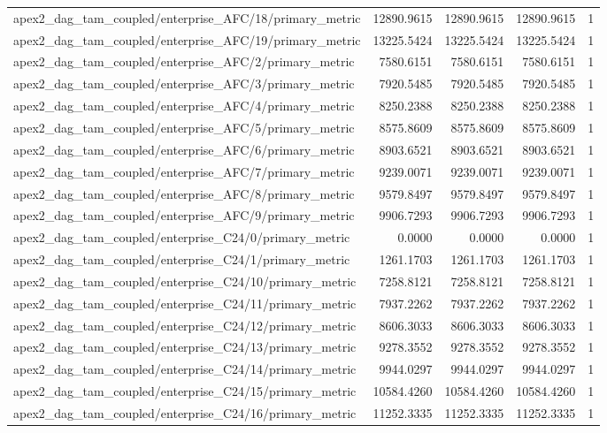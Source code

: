 \begin{table}[h]
\begin{tabular}{lrrrr}
apex2_dag_tam_coupled/enterprise_AFC/18/primary_metric & 12890.9615 & 12890.9615 & 12890.9615 & 1 \\
apex2_dag_tam_coupled/enterprise_AFC/19/primary_metric & 13225.5424 & 13225.5424 & 13225.5424 & 1 \\
apex2_dag_tam_coupled/enterprise_AFC/2/primary_metric & 7580.6151 & 7580.6151 & 7580.6151 & 1 \\
apex2_dag_tam_coupled/enterprise_AFC/3/primary_metric & 7920.5485 & 7920.5485 & 7920.5485 & 1 \\
apex2_dag_tam_coupled/enterprise_AFC/4/primary_metric & 8250.2388 & 8250.2388 & 8250.2388 & 1 \\
apex2_dag_tam_coupled/enterprise_AFC/5/primary_metric & 8575.8609 & 8575.8609 & 8575.8609 & 1 \\
apex2_dag_tam_coupled/enterprise_AFC/6/primary_metric & 8903.6521 & 8903.6521 & 8903.6521 & 1 \\
apex2_dag_tam_coupled/enterprise_AFC/7/primary_metric & 9239.0071 & 9239.0071 & 9239.0071 & 1 \\
apex2_dag_tam_coupled/enterprise_AFC/8/primary_metric & 9579.8497 & 9579.8497 & 9579.8497 & 1 \\
apex2_dag_tam_coupled/enterprise_AFC/9/primary_metric & 9906.7293 & 9906.7293 & 9906.7293 & 1 \\
apex2_dag_tam_coupled/enterprise_C24/0/primary_metric & 0.0000 & 0.0000 & 0.0000 & 1 \\
apex2_dag_tam_coupled/enterprise_C24/1/primary_metric & 1261.1703 & 1261.1703 & 1261.1703 & 1 \\
apex2_dag_tam_coupled/enterprise_C24/10/primary_metric & 7258.8121 & 7258.8121 & 7258.8121 & 1 \\
apex2_dag_tam_coupled/enterprise_C24/11/primary_metric & 7937.2262 & 7937.2262 & 7937.2262 & 1 \\
apex2_dag_tam_coupled/enterprise_C24/12/primary_metric & 8606.3033 & 8606.3033 & 8606.3033 & 1 \\
apex2_dag_tam_coupled/enterprise_C24/13/primary_metric & 9278.3552 & 9278.3552 & 9278.3552 & 1 \\
apex2_dag_tam_coupled/enterprise_C24/14/primary_metric & 9944.0297 & 9944.0297 & 9944.0297 & 1 \\
apex2_dag_tam_coupled/enterprise_C24/15/primary_metric & 10584.4260 & 10584.4260 & 10584.4260 & 1 \\
apex2_dag_tam_coupled/enterprise_C24/16/primary_metric & 11252.3335 & 11252.3335 & 11252.3335 & 1 \\

\end{tabular}
\end{table}
